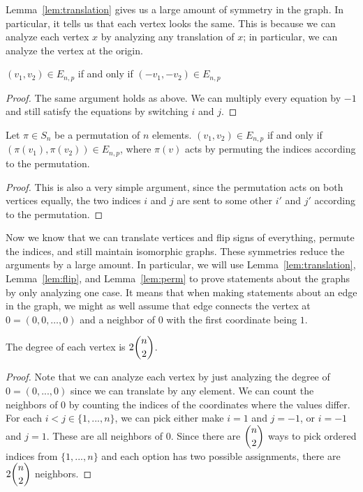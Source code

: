 \documentclass[runningheads,a4paper]{llncs}
\begin{document}
Lemma~\ref{lem:translation} gives us a large amount of symmetry in the graph. In particular, it tells us that each vertex looks the same. This is because we can analyze each vertex $x$ by analyzing any translation of $x$; in particular, we can analyze the vertex at the origin. 

\begin{lemma}
\label{lem:flip}
$(v_1, v_2) \in E_{n,p}$ if and only if $(-v_1, -v_2) \in E_{n,p}$
\end{lemma}

\begin{proof}
The same argument holds as above. We can multiply every equation by $-1$ and still satisfy the equations by switching $i$ and $j$.
\end{proof}

\begin{lemma}
\label{lem:perm}
Let $\pi \in S_n$ be a permutation of $n$ elements. $(v_1, v_2) \in E_{n,p}$ if and only if $(\pi(v_1), \pi(v_2)) \in E_{n,p}$, where $\pi(v)$ acts by permuting the indices according to the permutation. 
\end{lemma}

\begin{proof}
This is also a very simple argument, since the permutation acts on both vertices equally, the two indices $i$ and $j$ are sent to some other $i'$ and $j'$ according to the permutation.
\end{proof}

Now we know that we can translate vertices and flip signs of everything, permute the indices, and still maintain isomorphic graphs. These symmetries reduce the arguments by a large amount. In particular, we will use Lemma~\ref{lem:translation}, Lemma~\ref{lem:flip}, and Lemma~\ref{lem:perm} to prove statements about the graphs by only analyzing one case. It means that when making statements about an edge in the graph, we might as well assume that edge connects the vertex at $0 = (0,0,\dots, 0)$ and a neighbor of $0$ with the first coordinate being $1$. 

\begin{lemma}
The degree of each vertex is $2\dbinom{n}{2}$.
\end{lemma}

\begin{proof}
Note that we can analyze each vertex by just analyzing the degree of $0 = (0, ..., 0)$ since we can translate by any element. We can count the neighbors of 0 by counting the indices of the coordinates where the values differ. For each $i < j \in \{ 1, ..., n\}$, we can pick either make $i = 1$ and $j = -1$, or $i = -1$ and $j = 1$. These are all neighbors of $0$. Since there are $\dbinom{n}{2}$ ways to pick ordered indices from $\{1, ..., n\}$ and each option has two possible assignments, there are $2\dbinom{n}{2}$ neighbors.
\end{proof}
\end{document}
